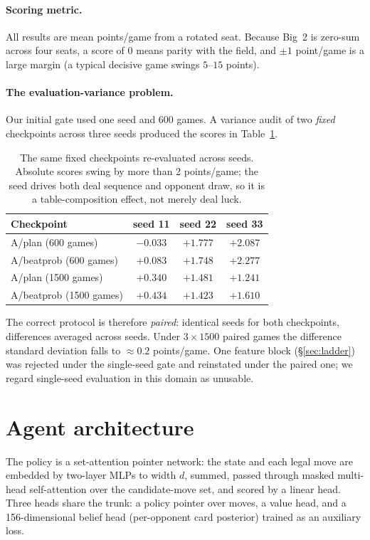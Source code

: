 \documentclass[11pt]{article}
\begin{document}
\paragraph{Scoring metric.} All results are mean points/game from a
rotated seat. Because Big~2 is zero-sum across four seats, a score of
$0$ means parity with the field, and $\pm 1$ point/game is a large
margin (a typical decisive game swings $5$--$15$ points).

\paragraph{The evaluation-variance problem.} Our initial gate used one
seed and 600 games. A variance audit of two \emph{fixed} checkpoints
across three seeds produced the scores in Table~\ref{tab:variance}.

\begin{table}[h]
\centering
\begin{tabular}{lccc}
\toprule
Checkpoint & seed 11 & seed 22 & seed 33 \\
\midrule
A/plan (600 games) & $-0.033$ & $+1.777$ & $+2.087$ \\
A/beatprob (600 games) & $+0.083$ & $+1.748$ & $+2.277$ \\
A/plan (1500 games) & $+0.340$ & $+1.481$ & $+1.241$ \\
A/beatprob (1500 games) & $+0.434$ & $+1.423$ & $+1.610$ \\
\bottomrule
\end{tabular}
\caption{The same fixed checkpoints re-evaluated across seeds. Absolute
scores swing by more than 2 points/game; the seed drives both deal
sequence and opponent draw, so it is a table-composition effect, not
merely deal luck.}
\label{tab:variance}
\end{table}

The correct protocol is therefore \emph{paired}: identical seeds for
both checkpoints, differences averaged across seeds. Under
$3 \times 1500$ paired games the difference standard deviation falls to
$\approx 0.2$ points/game. One feature block (\S\ref{sec:ladder}) was
rejected under the single-seed gate and reinstated under the paired
one; we regard single-seed evaluation in this domain as unusable.

\section{Agent architecture}

The policy is a set-attention pointer network: the state and each legal
move are embedded by two-layer MLPs to width $d$, summed, passed
through masked multi-head self-attention over the candidate-move set,
and scored by a linear head. Three heads share the trunk: a policy
pointer over moves, a value head, and a 156-dimensional belief head
(per-opponent card posterior) trained as an auxiliary loss.
\end{document}
